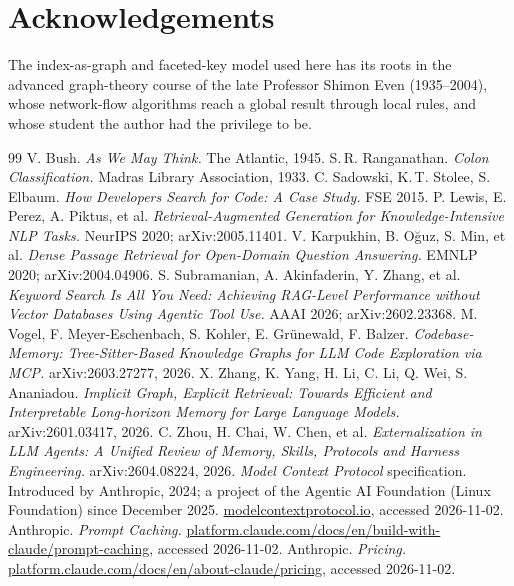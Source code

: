 \documentclass[11pt]{article}
\begin{document}
\section*{Acknowledgements}

The index-as-graph and faceted-key model used here has its roots in the advanced
graph-theory course of the late Professor Shimon Even (1935--2004), whose
network-flow algorithms reach a global result through local rules, and whose
student the author had the privilege to be.

\small
\begin{thebibliography}{99}
 V. Bush. \emph{As We May Think.} The Atlantic, 1945.
 S.\,R. Ranganathan. \emph{Colon Classification.} Madras Library Association, 1933.
 C. Sadowski, K.\,T. Stolee, S. Elbaum. \emph{How Developers Search for Code: A Case Study.} FSE 2015.
 P. Lewis, E. Perez, A. Piktus, et al. \emph{Retrieval-Augmented Generation for Knowledge-Intensive NLP Tasks.} NeurIPS 2020; arXiv:2005.11401.
 V. Karpukhin, B. O\u{g}uz, S. Min, et al. \emph{Dense Passage Retrieval for Open-Domain Question Answering.} EMNLP 2020; arXiv:2004.04906.
 S. Subramanian, A. Akinfaderin, Y. Zhang, et al. \emph{Keyword Search Is All
You Need: Achieving RAG-Level Performance without Vector Databases Using Agentic
Tool Use.} AAAI 2026; arXiv:2602.23368.
 M. Vogel, F. Meyer-Eschenbach, S. Kohler, E. Gr\"unewald, F. Balzer.
\emph{Codebase-Memory: Tree-Sitter-Based Knowledge Graphs for LLM Code Exploration
via MCP.} arXiv:2603.27277, 2026.
 X. Zhang, K. Yang, H. Li, C. Li, Q. Wei, S. Ananiadou. \emph{Implicit Graph,
Explicit Retrieval: Towards Efficient and Interpretable Long-horizon Memory for
Large Language Models.} arXiv:2601.03417, 2026.
 C. Zhou, H. Chai, W. Chen, et al. \emph{Externalization in LLM Agents: A
Unified Review of Memory, Skills, Protocols and Harness Engineering.}
arXiv:2604.08224, 2026.
 \emph{Model Context Protocol} specification. Introduced by Anthropic, 2024; a project of the Agentic AI Foundation (Linux Foundation) since December 2025. \href{https://modelcontextprotocol.io}{modelcontextprotocol.io}, accessed 2026-11-02.
 Anthropic. \emph{Prompt Caching.} \href{https://platform.claude.com/docs/en/build-with-claude/prompt-caching}{platform.claude.com/docs/en/build-with-claude/prompt-caching}, accessed 2026-11-02.
 Anthropic. \emph{Pricing.} \href{https://platform.claude.com/docs/en/about-claude/pricing}{platform.claude.com/docs/en/about-claude/pricing}, accessed 2026-11-02.

\end{thebibliography}
\end{document}
